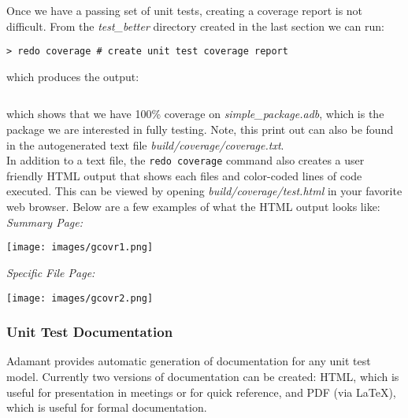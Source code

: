 Once we have a passing set of unit tests, creating a coverage report is not difficult. From the \textit{test\_better} directory created in the last section we can run:

\vspace{5mm} %
\begin{verbatim}
> redo coverage # create unit test coverage report
\end{verbatim}
\vspace{5mm} %

which produces the output:

\vspace{5mm} %
\inputminted{text}{../example_architecture/simple_package/test_better3/build/coverage/coverage.txt}
\vspace{5mm} %

which shows that we have 100\% coverage on \textit{simple\_package.adb}, which is the package we are interested in fully testing. Note, this print out can also be found in the autogenerated text file \textit{build/coverage/coverage.txt}. \\

In addition to a text file, the \texttt{redo coverage} command also creates a user friendly HTML output that shows each files and color-coded lines of code executed. This can be viewed by opening \textit{build/coverage/test.html} in your favorite web browser. Below are a few examples of what the HTML output looks like: \\

\textit{Summary Page:}

\vspace{5mm} %
\texttt{[image: images/gcovr1.png]}
\vspace{5mm} %

\textit{Specific File Page:}

\vspace{5mm} %
\texttt{[image: images/gcovr2.png]}
\vspace{5mm} %


\subsubsection{Unit Test Documentation} \label{Unit Test Documentation}

Adamant provides automatic generation of documentation for any unit test model. Currently two versions of documentation can be created: HTML, which is useful for presentation in meetings or for quick reference, and PDF (via \LaTeX), which is useful for formal documentation.\\

